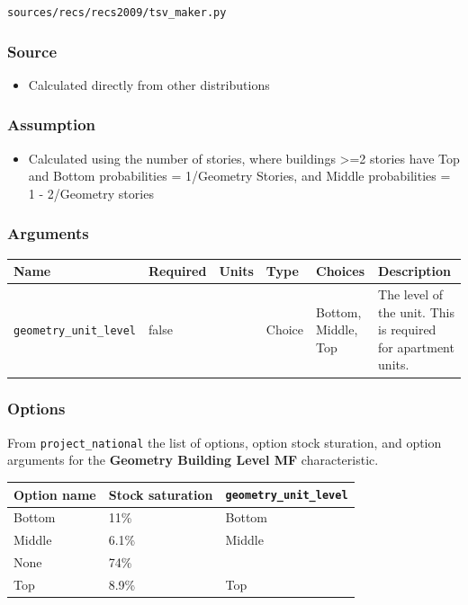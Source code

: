 \texttt{sources/recs/recs2009/tsv\_maker.py}

\subsubsection{Source}\label{source-45}

\begin{itemize}
 
\item
  Calculated directly from other distributions
\end{itemize}

\subsubsection{Assumption}\label{assumption-25}

\begin{itemize}
 
\item
  Calculated using the number of stories, where buildings \textgreater=2
  stories have Top and Bottom probabilities = 1/Geometry Stories, and
  Middle probabilities = 1 - 2/Geometry stories
\end{itemize}

\subsubsection{Arguments}\label{arguments-30}

\begin{longtable}[]{@{}llllll@{}}
\toprule\noalign{}
Name & Required & Units & Type & Choices & Description \\
\midrule\noalign{}
\endhead
\bottomrule\noalign{}
\endlastfoot
\texttt{geometry\_unit\_level} & false & & Choice & Bottom, Middle, Top
& The level of the unit. This is required for apartment units. \\
\end{longtable}

\subsubsection{Options}\label{options-46}

From \texttt{project\_national} the list of options, option stock
sturation, and option arguments for the \textbf{Geometry Building Level
MF} characteristic.

\begin{longtable}[]{@{}lll@{}}
\toprule\noalign{}
Option name & Stock saturation & \texttt{geometry\_unit\_level} \\
\midrule\noalign{}
\endhead
\bottomrule\noalign{}
\endlastfoot
Bottom & 11\% & Bottom \\
Middle & 6.1\% & Middle \\
None & 74\% & \\
Top & 8.9\% & Top \\
\end{longtable}

